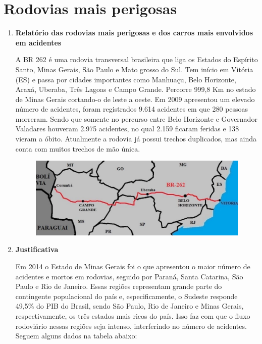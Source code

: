 \chapter[Rodovias mais perigosas]{Rodovias mais perigosas}

\begin{enumerate}

\item \textbf{Relatório das rodovias mais perigosas e dos carros mais envolvidos em acidentes}

A BR 262 é uma rodovia transversal brasileira que liga os Estados do Espírito Santo, Minas Gerais, São Paulo e Mato grosso do Sul. Tem início em Vitória (ES) e passa por cidades importantes como Manhuaçu, Belo Horizonte, Araxá, Uberaba, Três Lagoas e Campo Grande. Percorre 999,8 Km no estado de Minas Gerais cortando-o de leste a oeste. Em 2009 apresentou um elevado número de acidentes, foram registrados 9.614 acidentes em que 280 pessoas morreram. Sendo que somente no percurso entre Belo Horizonte e Governador Valadares houveram 2.975 acidentes, no qual 2.159 ficaram feridas e 138 vieram a óbito. Atualmente a rodovia já possui trechos duplicados, mas ainda conta com muitos trechos de mão única.

\begin{figure}[h]
  \centering
  \includegraphics[width=400px, scale=0.5]{figuras/mapa}
  \label{table:mapa}
\end{figure}

\item \textbf{Justificativa}

Em 2014 o Estado de Minas Gerais foi o que apresentou o maior número de acidentes e mortos em rodovias, seguido por Paraná, Santa Catarina, São Paulo e Rio de Janeiro. Essas regiões representam grande parte do contingente populacional do país e, especificamente, o Sudeste responde 49,5\% do PIB do Brasil, sendo São Paulo, Rio de Janeiro e Minas Gerais, respectivamente, os três estados mais ricos do país. Isso faz com que o fluxo rodoviário nessas regiões seja intenso, interferindo no número de acidentes. Seguem alguns dados na tabela abaixo:


\end{enumerate}
